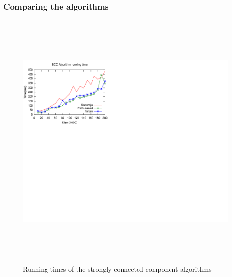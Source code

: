 \documentclass[english]{tktltiki2}
\theoremstyle{definition}
\theoremstyle{remark}
\begin{document}
\subsubsection{Comparing the algorithms}
\begin{figure}
  \centering
  \includegraphics[width=600px,height=500px,keepaspectratio,trim=10 200 200 10]{SCCAlgorithmPerformanceFigure}
  \caption{Running times of the strongly connected component algorithms}
\end{figure}







% 
\end{document}
